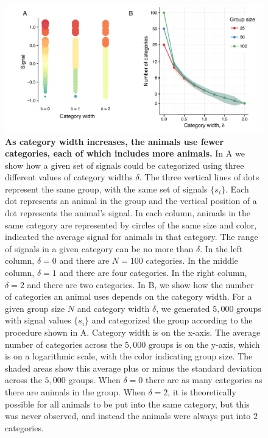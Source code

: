 \begin{figure}[ht]
\includegraphics[width=6.85in]{figures/category_diagram.pdf}
\caption{\sffamily\small\textbf{As category width increases, the animals use fewer categories, each of which includes more animals.} 
In A we show how a given set of signals could be categorized using three different values of category widths $\delta$. The three vertical lines of dots represent the same group, with the same set of signals $\{s_i\}$. Each dot represents an animal in the group and the vertical position of a dot represents the animal's signal. In each column, animals in the same category are represented by circles of the same size and color, indicated the average signal for animals in that category. The range of signals in a given category can be no more than $\delta$. In the left column, $\delta=0$ and there are $N=100$ categories. In the middle column, $\delta=1$ and there are four categories. In the right column, $\delta=2$ and there are two categories.  In B, we show how the number of categories an animal uses depends on the category width. For a given group size $N$ and category width $\delta$, we generated $5,000$ groups with signal values $\{s_i\}$ and categorized the group according to the procedure shown in A.  Category width is on the x-axis. The average number of categories across the $5,000$ groups is on the y-axis, which is on a logarithmic scale, with the color indicating group size. The shaded areas show this average plus or minus the standard deviation across the $5,000$ groups. When $\delta=0$ there are as many categories as there are animals in the group. When $\delta=2$, it is theoretically possible for all animals to be put into the same category, but this was never observed, and instead the animals were always put into $2$ categories. }
 \label{category_diagram}
\end{figure}

